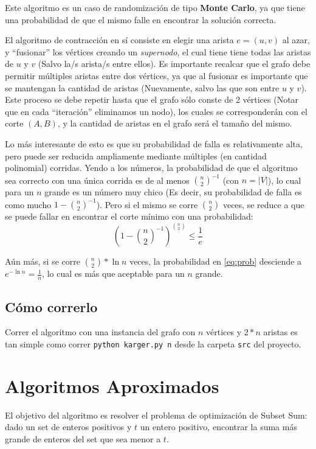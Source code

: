 \documentclass[a4paper,10pt]{article}
\begin{document}
Este algoritmo es un caso de randomización de tipo \textbf{Monte Carlo}, ya que tiene una probabilidad de que el mismo falle en encontrar la solución correcta.

El algoritmo de contracción en sí consiste en elegir una arista $e=(u,v)$ al azar, y “fusionar” los vértices creando un \textit{supernodo}, el cual tiene tiene todas las aristas de $u$ y $v$ (Salvo la/s arista/s entre ellos). Es importante recalcar que el grafo debe permitir múltiples aristas entre dos vértices, ya que al fusionar es importante que se mantengan la cantidad de aristas (Nuevamente, salvo las que son entre $u$ y $v$). Este proceso se debe repetir hasta que el grafo sólo conste de 2 vértices (Notar que en cada ``iteración'' eliminamos un nodo), los cuales se corresponderán con el corte $(A,B)$, y la cantidad de aristas en el grafo será el tamaño del mismo.

Lo más interesante de esto es que su probabilidad de falla es relativamente alta, pero puede ser reducida ampliamente mediante múltiples (en cantidad polinomial) corridas. Yendo a los números, la probabilidad de que el algoritmo sea correcto con una única corrida es de al menos ${\binom{n}{2}}^{-1}$ (con $n = |V|$), lo cual para un $n$ grande es un número muy chico (Es decir, su probabilidad de falla es como mucho $1 - {\binom{n}{2}}^{-1}$). Pero si el mismo se corre $\binom{n}{2}$ veces, se reduce a que se puede fallar en encontrar el corte mínimo con una probabilidad:
\begin{equation}
	\label{eq:prob}
	(1 - {\binom{n}{2}}^{-1})^{\binom{n}{2}} \leq \frac{1}{e} \tag{2.1}
\end{equation}

Aún más, si se corre $\binom{n}{2}*\ln n$ veces, la probabilidad en \ref{eq:prob} desciende a $e^{-\ln n} = \frac{1}{n}$, lo cual es más que aceptable para un $n$ grande.

\subsection{Cómo correrlo}
Correr el algoritmo con una instancia del grafo con $n$ vértices y $2*n$ aristas es tan simple como correr \texttt{python karger.py n} desde la carpeta \texttt{src} del proyecto.

\section{Algoritmos Aproximados}
El objetivo del algoritmo es resolver el problema de optimización de Subset Sum: dado un set de enteros positivos y $t$ un entero positivo, encontrar la suma más grande de enteros del set que sea menor a $t$.
\end{document}
